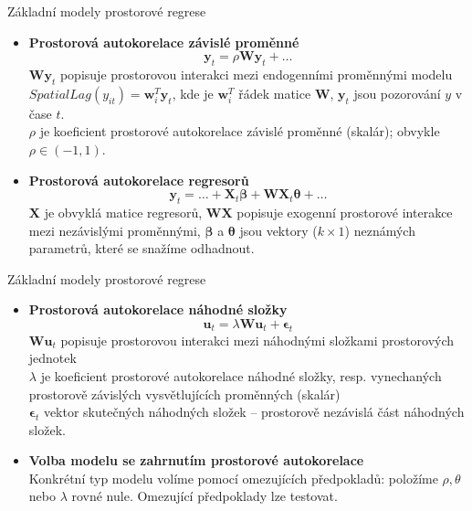 \documentclass{beamer}
\begin{document}
\begin{frame}{Základní modely prostorové regrese}
\begin{itemize}
	\item \textbf{Prostorová autokorelace závislé proměnné}
	$$\bm{y}_t = \rho \bm{W}\bm{y}_t + \dots$$
	$\bm{Wy}_t$ popisuje prostorovou interakci mezi endogenními proměnnými modelu
	$\textit{SpatialLag}(y_{it}) = \bm{w}^T_i \bm{y}_t$, kde je $ \bm{w}^T_i$ řádek matice $\bm{W}$, $\bm{y}_t$ jsou pozorování $y$ v čase $t$.\\
	$\rho$ je koeficient prostorové autokorelace závislé proměnné (skalár); obvykle $\rho \in (-1,1)$.
	\item \textbf{Prostorová autokorelace regresorů}
	$$\bm{y}_t = \dots + \bm{X}_t \bm{\beta} + \bm{W}\bm{X}_t \bm{\theta} + \dots$$
	$\bm{X}$ je obvyklá matice regresorů, $\bm{WX}$ popisuje exogenní prostorové interakce mezi nezávislými proměnnými, $\bm{\beta}$ a $\bm{\theta}$ jsou vektory ($k\times 1$) neznámých parametrů, které se snažíme odhadnout.
\end{itemize}
\end{frame}
\begin{frame}{Základní modely prostorové regrese}
\begin{itemize}
	\item \textbf{Prostorová autokorelace náhodné složky} 
	$$\bm{u}_t = \lambda \bm{Wu}_t + \bm{\epsilon}_t$$
	 $\bm{Wu}_t$ popisuje prostorovou interakci mezi náhodnými složkami prostorových jednotek \\
	 $\lambda$ je koeficient prostorové autokorelace náhodné složky, resp. vynechaných prostorově  závislých vysvětlujících proměnných (skalár) \\
	 $\bm{\epsilon}_t$ vektor skutečných náhodných složek – prostorově nezávislá část náhodných složek.
	\item \textbf{Volba modelu se zahrnutím prostorové autokorelace} \\
		Konkrétní typ modelu volíme pomocí omezujících předpokladů: položíme $\rho,\theta$ nebo $\lambda$ rovné nule.
	Omezující předpoklady lze testovat. 
\end{itemize}
\end{frame}
\end{document}
